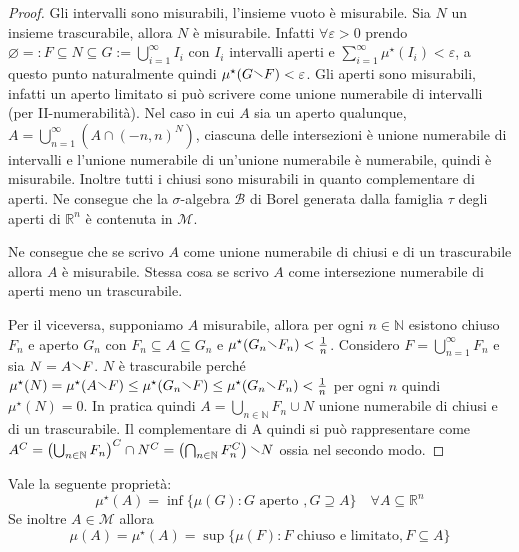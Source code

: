 \begin{proof}
    Gli intervalli sono misurabili, l'insieme vuoto è misurabile.
    Sia \(N\) un insieme trascurabile, allora \(N\) è misurabile. Infatti
    \(\forall \varepsilon >0\) prendo \(\varnothing =: F \subseteq N \subseteq G
    := \bigcup_{i=1}^{\infty} I_{i} \) con \(I_{i}\) intervalli aperti e
    \(\sum_{i=1}^{\infty} \mu^\star(I_{i}) < \varepsilon \), a questo punto
    naturalmente quindi \(\mu^\star(G \sminus F) < \varepsilon\).
    Gli aperti sono misurabili, infatti un aperto limitato si può scrivere come unione
    numerabile di intervalli (per II-numerabilità). Nel caso in cui \(A\) sia un aperto qualunque, \(A =
    \bigcup_{n=1}^{\infty} \left( A \cap {(-n, n)}^{N} \right)\), ciascuna delle intersezioni è unione numerabile di intervalli e l'unione numerabile di un'unione numerabile è numerabile, quindi è
    misurabile. Inoltre tutti i chiusi sono misurabili in quanto complementare
    di aperti. Ne consegue che la \(\sigma\)-algebra \(\mathcal{B}\) di Borel
    generata dalla famiglia \(\tau\) degli aperti di \(\mathbb{R}^{n}\) è
    contenuta in \(\mathcal{M}\).

    Ne consegue che se scrivo \(A\) come unione numerabile di chiusi e di un
    trascurabile allora \(A\) è misurabile. Stessa cosa se scrivo \(A\) come
    intersezione numerabile di aperti meno un trascurabile.

    Per il viceversa, supponiamo \(A\) misurabile, allora per ogni \(n \in
    \mathbb{N}\) esistono chiuso \(F_{n}\) e aperto \(G_{n}\) con \(F_{n}
    \subseteq A \subseteq G_{n}  \) e \(\mu^\star(G_{n} \sminus F_{n}) <
    \frac{1}{n}\). Considero \(F = \bigcup_{n=1}^{\infty}F_{n}\) e sia \(N =
    A \sminus F\). \(N\) è trascurabile perché \(\mu^\star(N) =
    \mu^\star(A \sminus F) \le \mu^\star(G_{n} \sminus F) \le \mu^\star(G_{n} \sminus 
    F_{n}) < \frac{1}{n}\) per ogni \(n\) quindi \(\mu^\star(N) = 0\). In
    pratica quindi \(A = \bigcup_{n \in \mathbb{N}} F_{n}  \cup N\) unione
    numerabile di chiusi e di un trascurabile. Il complementare di A quindi si
può rappresentare come \(A^{C} = {\left(\bigcup_{n \in \mathbb{N}} F_{n} \right)}^{C} \cap
N^{C} = \left(\bigcap_{n \in \mathbb{N}} F_{n}^{C}\right) \sminus N\) ossia nel
secondo modo.
\end{proof}
\begin{proposition}\label{prop:prop_6}
    Vale la seguente proprietà:
    \[
        \mu^\star(A) = \inf \{\mu(G) : G \text{ aperto }, G \supseteq A \} \quad
        \forall A \subseteq \mathbb{R}^{n} 
    \]
    Se inoltre \(A \in \mathcal{M}\) allora 
    \[
        \mu(A) = \mu^\star(A) = \sup \{\mu(F) : F \text{ chiuso e limitato}, F
        \subseteq A \} 
    \]
\end{proposition}
